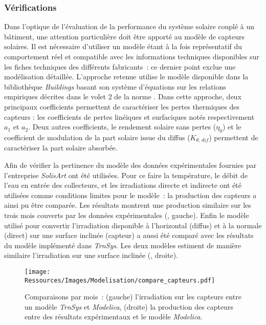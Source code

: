\subsubsection{Vérifications} %
\label{ssub:verifications}
Dans l’optique de l’évaluation de la performance  du système solaire couplé à un bâtiment,
une attention particulière doit être apporté au modèle de capteurs solaires. Il est
nécessaire d’utiliser un modèle étant à la fois représentatif du comportement réel et
compatible avec les informations techniques disponibles sur les fiches techniques des
différents fabricants~: ce dernier point exclue une modélisation détaillée. L’approche
retenue utilise le modèle disponible dans la bibliothèque \textit{Buildings} basant son
système d’équations sur les relations empiriques décrites dans le volet 2 de la norme
\textcite{EN1297522006}. Dans cette approche, deux principaux coefficients permettent de
caractériser les pertes thermiques des capteurs : les coefficients de pertes linéiques et
surfaciques notés respectivement $a_{1}$ et $a_{2}$. Deux autres coefficients, le rendement
solaire sans pertes ($\eta_{0}$) et le coefficient de modulation de la part solaire issue du diffus
($K_{\theta,\, dif}$) permettent de caractériser la part solaire absorbée.

Afin de vérifier la pertinence du modèle des données expérimentales fournies
par l’entreprise \textit{SolisArt} ont été utilisées.
Pour ce faire la température, le débit de l’eau en entrée des collecteurs, et les
irradiations directe et indirecte ont été utilisées comme conditions limites pour le
modèle~: la production des capteurs a ainsi pu être comparée. Les résultats montrent une
production similaire sur les trois mois couverts par les données expérimentales
(, gauche). Enfin le modèle utilisé pour convertir
l’irradiation disponible à l’horizontal (diffus) et à la normale (direct) sur une surface
inclinée (capteur) a aussi été comparé avec les résultats du modèle implémenté dans
\textit{TrnSys}. Les deux modèles estiment de manière similaire l’irradiation sur une
surface inclinée (, droite).

\begin{figure}
    \centering
    \texttt{[image: Ressources/Images/Modelisation/compare\_capteurs.pdf]}
    \caption[Comparaisons de l’irradiation entre \textit{TrnSys}, \textit{Modelica}]
             {Comparaisons par mois~: (gauche) l’irradiation sur les capteurs entre un modèle
             \textit{TrnSys} et \textit{Modelica}, (droite) la production des capteurs entre des résultats
             expérimentaux et le modèle \textit{Modelica}.}
    \label{fig:compare_capteurs}
\end{figure}
\FloatBarrier


